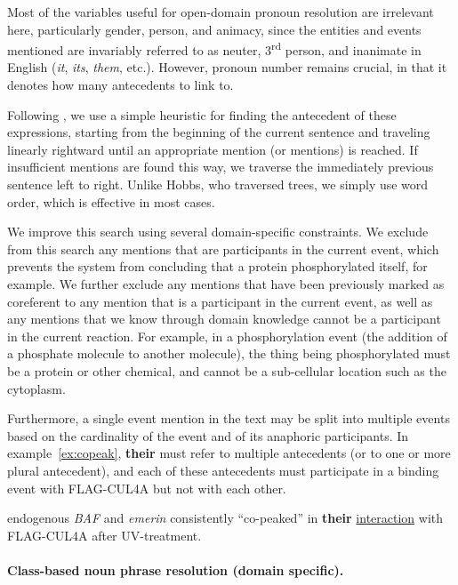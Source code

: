 Most of the variables useful for open-domain pronoun resolution are irrelevant here, 
particularly gender, person, and animacy, since the entities and events mentioned are invariably referred to as neuter, 
3\textsuperscript{rd} person, and inanimate in English ({\it it}, {\it its}, {\it them}, etc.). However, pronoun number remains crucial, in that it denotes how many antecedents to link to.

Following , we use a simple heuristic for finding the antecedent of these expressions, starting from the beginning of the current sentence and traveling linearly rightward until an appropriate mention (or mentions) is reached. If insufficient mentions are found this way, we traverse the immediately previous sentence left to right. Unlike Hobbs, who traversed trees, we simply use word order, which is effective in most cases.

We improve this search using several domain-specific constraints. 
We exclude from this search any mentions that are participants in the current event, which prevents the system from concluding that a protein phosphorylated itself, for example. We further exclude any mentions that have been previously marked as coreferent to any mention that is a participant in the current event, as well as any mentions that we know through domain knowledge cannot be a participant in the current reaction. For example, in a phosphorylation event (the addition of a phosphate molecule to another molecule), the thing being phosphorylated must be a protein or other chemical, and cannot be a sub-cellular location such as the cytoplasm.

Furthermore, a single event mention in the text may be split into multiple events based on the cardinality of the event and of its anaphoric participants. In example~\ref{ex:copeak}, {\bf their} must refer to multiple antecedents (or to one or more plural antecedent), and each of these antecedents must participate in a binding event with FLAG-CUL4A but not with each other.

\begin{exe}
	\ex\label{ex:copeak} \textellipsis endogenous {\it BAF} and {\it emerin} consistently ``co-peaked'' in {\bf their} \underline{interaction} with FLAG-CUL4A after UV-treatment.
\end{exe}

\paragraph{Class-based noun phrase resolution (domain specific).}

